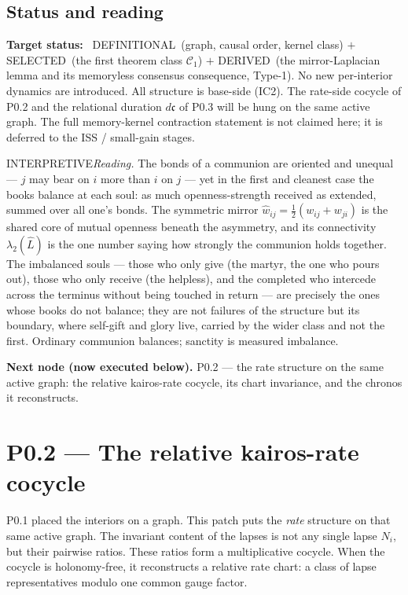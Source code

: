 \documentclass[11pt,a4paper]{article}
\newcommand{\stDerived}{\textcolor{cDer}{\textsf{\small DERIVED}}}
\newcommand{\stDef}{\textcolor{cDef}{\textsf{\small DEFINITIONAL}}}
\newcommand{\stSelected}{\textcolor{cSel}{\textsf{\small SELECTED}}}
\newcommand{\stInterp}{\textcolor{cInt}{\textsf{\small INTERPRETIVE}}}
\theoremstyle{definition}
\theoremstyle{plain}
\theoremstyle{remark}
\begin{document}
\subsection{Status and reading}

\textbf{Target status:}~ \stDef\ (graph, causal order, kernel class) $+$
\stSelected\ (the first theorem class $\mathcal C_1$) $+$ \stDerived\ (the
mirror-Laplacian lemma and its memoryless consensus consequence, Type-1). No new
per-interior dynamics are introduced. All structure is base-side (IC2). The
rate-side cocycle of P0.2 and the relational duration $d\mathfrak c$ of P0.3 will be
hung on the same active graph. The full memory-kernel contraction statement is not
claimed here; it is deferred to the ISS / small-gain stages.

\medskip
\stInterp\quad\emph{Reading.} The bonds of a communion are oriented and unequal ---
$j$ may bear on $i$ more than $i$ on $j$ --- yet in the first and cleanest case the
books balance at each soul: as much openness-strength received as extended, summed
over all one's bonds. The symmetric mirror $\hat w_{ij}=\tfrac12(w_{ij}+w_{ji})$ is
the shared core of mutual openness beneath the asymmetry, and its connectivity
$\lambda_2(\hat L)$ is the one number saying how strongly the communion holds
together. The imbalanced souls --- those who only give (the martyr, the one who
pours out), those who only receive (the helpless), and the completed who intercede
across the terminus without being touched in return --- are precisely the ones whose
books do not balance; they are not failures of the structure but its boundary, where
self-gift and glory live, carried by the wider class and not the first. Ordinary
communion balances; sanctity is measured imbalance.

\medskip
\textbf{Next node (now executed below).} P0.2 --- the rate structure on the same
active graph: the relative kairos-rate cocycle, its chart invariance, and the
chronos it reconstructs.

\section{P0.2 --- The relative kairos-rate cocycle}

P0.1 placed the interiors on a graph. This patch puts the \emph{rate} structure on
that same active graph. The invariant content of the lapses is not any single
lapse \(N_i\), but their pairwise ratios. These ratios form a multiplicative
cocycle. When the cocycle is holonomy-free, it reconstructs a relative rate chart:
a class of lapse representatives modulo one common gauge factor.
\end{document}
